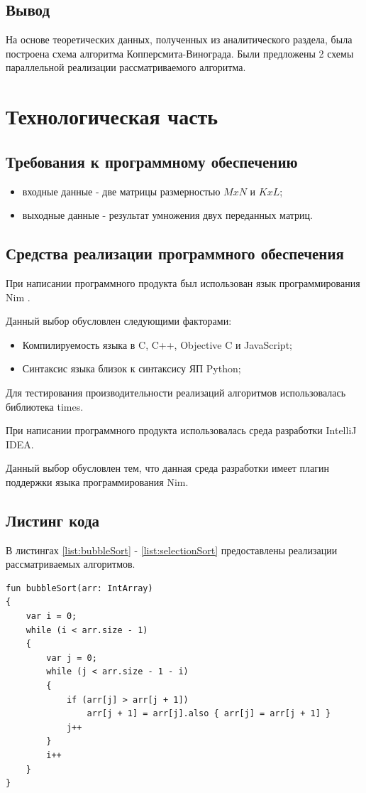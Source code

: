 \documentclass[12pt]{report}
\begin{document}
\newpage

\section*{Вывод}
На основе теоретических данных, полученных из аналитического раздела, была построена схема алгоритма Копперсмита-Винограда. Были предложены 2 схемы параллельной реализации рассматриваемого алгоритма.

\chapter{Технологическая часть}
\section{Требования к программному обеспечению}
\begin{itemize}
\item входные данные - две матрицы размерностью $MxN$ и $KxL$;
\item выходные данные - результат умножения двух переданных матриц.
\end{itemize}

\section{Средства реализации программного обеспечения}
При написании программного продукта был использован язык программирования Nim \cite{Nim}.

Данный выбор обусловлен следующими факторами:
\begin{itemize}
\item Компилируемость языка в C, C++, Objective C и JavaScript;
\item Синтаксис языка близок к синтаксису ЯП Python;
\end{itemize}

Для тестирования производительности реализаций алгоритмов использовалась библиотека times.

При написании программного продукта использовалась среда разработки IntelliJ IDEA.

Данный выбор обусловлен тем, что данная среда разработки имеет плагин поддержки языка программирования Nim.

\section{Листинг кода}
В листингах \ref{list:bubbleSort} - \ref{list:selectionSort} предоставлены реализации рассматриваемых алгоритмов.
\begin{lstlisting}[caption=Функция реализации алгоритма сортировки пузырьком,
label={list:bubbleSort}]
fun bubbleSort(arr: IntArray)
{
    var i = 0;
    while (i < arr.size - 1)
    {
        var j = 0;
        while (j < arr.size - 1 - i)
        {
            if (arr[j] > arr[j + 1])
                arr[j + 1] = arr[j].also { arr[j] = arr[j + 1] }
            j++
        }
        i++
    }
}
\end{lstlisting}
\end{document}
